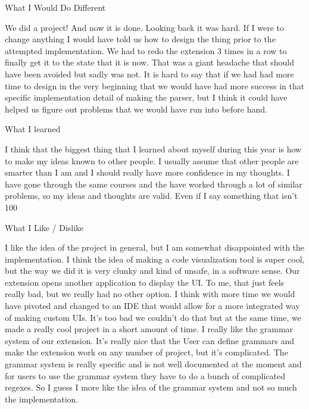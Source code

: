 What I Would Do Different



We did a project! And now it is done. Looking back it was hard. If I were to change anything I would have told us how to design the thing prior to the attempted implementation. We had to redo the extension 3 times in a row to finally get it to the state that it is now. That was a giant headache that should have been avoided but sadly was not. It is hard to say that if we had had more time to design in the very beginning that we would have had more success in that specific implementation detail of making the parser, but I think it could have helped us figure out problems that we would have run into before hand.



What I learned



I think that the biggest thing that I learned about myself during this year is how to make my ideas known to other people. I usually assume that other people are smarter than I am and I should really have more confidence in my thoughts. I have gone through the same courses and the have worked through a lot of similar problems, so my ideas and thoughts are valid. Even if I say something that isn't 100%



What I Like / Dislike



I like the idea of the project in general, but I am somewhat disappointed with the implementation. I think the idea of making a code visualization tool is super cool, but the way we did it is very clunky and kind of unsafe, in a software sense. Our extension opens another application to display the UI. To me, that just feels really bad, but we really had no other option. I think with more time we would have pivoted and changed to an IDE that would allow for a more integrated way of making custom UIs. It's too bad we couldn't do that but at the same time, we made a really cool project in a short amount of time. I really like the grammar system of our extension. It's really nice that the User can define grammars and make the extension work on any number of project, but it's complicated. The grammar system is really specific and is not well documented at the moment and for users to use the grammar system they have to do a bunch of complicated regexes. So I guess I more like the idea of the grammar system and not so much the implementation. 



